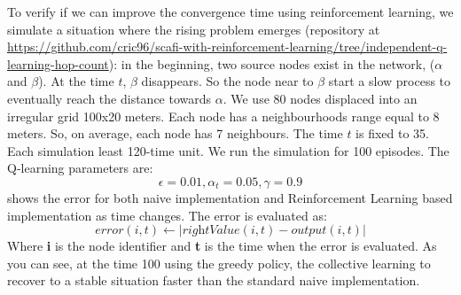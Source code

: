 \documentclass[conference]{IEEEtran}
\begin{document}
To verify if we can improve the convergence time using reinforcement learning,
 we simulate a situation where the rising problem emerges (repository at \url{https://github.com/cric96/scafi-with-reinforcement-learning/tree/independent-q-learning-hop-count}):
 in the beginning, two source nodes exist in the network, ($\alpha$ and $\beta$).
 At the time $t$, $\beta$ disappears. So the node near to $\beta$ start a slow process
 to eventually reach the distance towards $\alpha$.
%
We use 80 nodes displaced into an irregular grid 100x20 meters. 
 Each node has a neighbourhoods range equal to 8 meters. 
 So, on average, each node has 7 neighbours.
 The time $t$ is fixed to 35.
 Each simulation least 120-time unit.
% 
We run the simulation for 100 episodes.
 The Q-learning parameters are:
$$
\epsilon = 0.01, 
\alpha_t = 0.05,
\gamma = 0.9
$$
 shows the error for both naive implementation and Reinforcement Learning based implementation as time changes.
The error is evaluated as:
$$
error(i, t) \leftarrow  | \textit{rightValue}(i,t) - \textit{output}(i,t) |
$$
Where \textbf{i} is the node identifier and \textbf{t} is the time when the error is evaluated.
%
As you can see, at the time 100 using the greedy policy, the collective learning to recover to a stable situation
 faster than the standard naive implementation.
\end{document}
